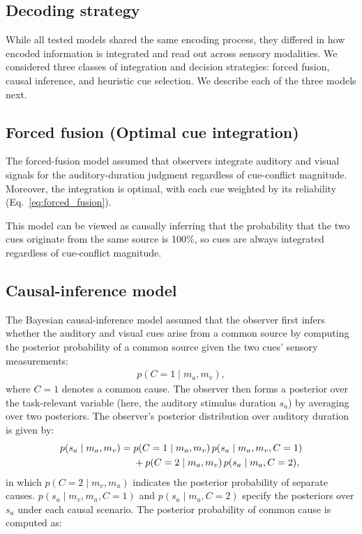 \documentclass{jov}
\begin{document}
\subsection{Decoding strategy}
While all tested models shared the same encoding process, they differed in how encoded information is integrated and read out across sensory modalities. We considered three classes of integration and decision strategies: forced fusion, causal inference, and heuristic cue selection. We describe each of the three models next.  

% 

\subsection{Forced fusion (Optimal cue integration)}
The forced-fusion model assumed that observers integrate auditory and visual signals for the auditory-duration judgment regardless of cue-conflict magnitude. Moreover, the integration is optimal, with each cue weighted by its reliability (Eq.~\ref{eq:forced_fusion}). 

This model can be viewed as causally inferring that the probability that the two cues originate from the same source is 100\%, so cues are always integrated regardless of cue-conflict magnitude. 

\subsection{Causal-inference model}
The Bayesian causal-inference model assumed that the observer first infers whether the auditory and visual cues arise from a common source by computing the posterior probability of a common source given the two cues' sensory measurements:
\begin{align}
p(C = 1 \mid m_a, m_v),
\label{eq:pc}
\end{align}
where $C = 1$ denotes a common cause. The observer then forms a posterior over the task-relevant variable (here, the auditory stimulus duration $s_a$) by averaging over two posteriors. The observer's posterior distribution over auditory duration is given by:
\begin{align}
p(s_a \mid m_a, m_v)
= {}& p(C = 1 \mid m_a, m_v)\,
      p(s_a \mid m_a, m_v,C=1) \notag\\
&+ p(C = 2 \mid m_a, m_v)\,
   p(s_a \mid m_a,C=2),
\label{eq:auditory_bimodal_estimate}
\end{align}
in which $p(C = 2 \mid m_v, m_a)$ indicates the posterior probability of separate causes. $p(s_a \mid m_v, m_a, C=1)$ and $p(s_a \mid m_a,C=2)$ specify the posteriors over $s_a$ under each causal scenario. The posterior probability of common cause is computed as:
\end{document}
